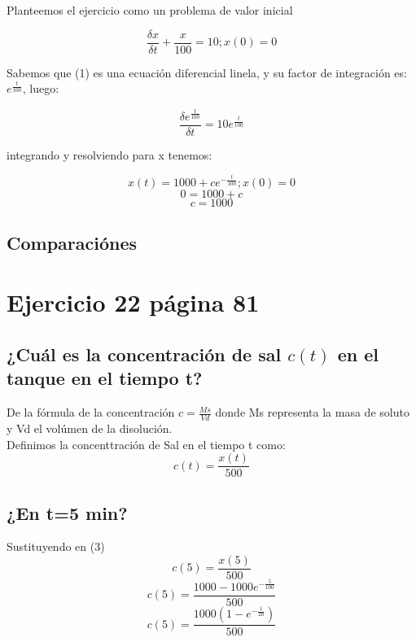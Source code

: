 \documentclass{article}
\begin{document}
        Planteemos el ejercicio como un problema de valor inicial

        \begin{equation}
            \frac{\delta x}{\delta t} + \frac{x}{100} = 10; x(0) = 0
        \end{equation}

        Sabemos que (1) es una ecuación diferencial linela, y su factor de integración es: $e^{\frac{t}{100}}$, luego:

        \begin{equation}
            \frac{\delta e^{\frac{t}{100}}}{\delta t} = 10 e^{\frac{t}{100}}
        \end{equation}

        integrando y resolviendo para x tenemos:

        \[ x(t) = 1000 + c e^{-\frac{t}{100}} ; x(0) = 0\]
        \[0 = 1000+c\]
        \[c = 1000\]

        \begin{center}
        \end{center}
    
        \subsection{Comparaciónes}
        
    \section{Ejercicio 22 página 81}
        
        \subsection{¿Cuál es la concentración de sal $c(t)$ en el tanque en el tiempo t?}
            De la fórmula de la concentración $c = \frac{Ms}{Vd}$ donde Ms representa la masa 
            de soluto y Vd el volúmen de la disolución.\\ 
            Definimos la concenttración de Sal en el tiempo t como:
            \begin{equation}
                c(t) = \frac{x(t)}{500}
            \end{equation}
        \subsection{¿En t=5 min?}
            Sustituyendo en (3)
            \[ c(5) = \frac{x(5)}{500} \]
            \[ c(5) = \frac{1000-1000e^{-\frac{5}{100}}}{500} \]
            \[ c(5) = \frac{1000(1-e^{-\frac{1}{20}})}{500} \]
            \begin{center}
            \end{center}
    
\end{document}
